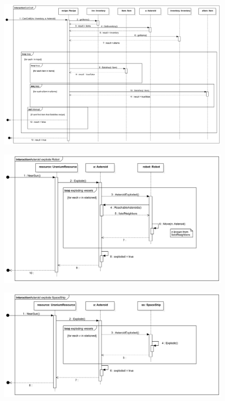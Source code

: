 \begin{figure}[H] 
\centering 
\includegraphics[width=1\textwidth]{docs/3_Project/svg/Design Model!CanCraftSeq!Can Craft!CanCraft_29.png} 
\end{figure} 

\begin{figure}[H] 
\centering 
\includegraphics[width=1\textwidth]{docs/3_Project/svg/Design Model!AsteroidExplodeRobo!Interaction1!Asteroid explode Robot_30.png} 
\end{figure} 

\begin{figure}[H] 
\centering 
\includegraphics[width=1\textwidth]{docs/3_Project/svg/Design Model!AsteroidExplodeSS!Interaction1!Asteroid explode SpaceShip_31.png} 
\end{figure} 

